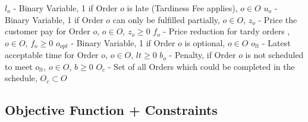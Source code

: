 \documentclass[a4paper,12pt,twoside]{scrreprt}
\begin{document}
\begin{flushleft}
$l_{o}$ - Binary Variable, 1 if Order $o$ is late (Tardiness Fee applies), $o \in O$ \linebreak
$u_{o}$ - Binary Variable, 1 if Order $o$ can only be fulfilled partially, $o \in O$, \linebreak
$z_{o}$ - Price the customer pay for Order $o$, $o \in O$, $z_{o} \geq 0$ \linebreak
$f_{o}$ - Price reduction for tardy orders , $o \in O$, $f_{o} \geq 0$ \linebreak
$o_{opt}$ - Binary Variable, 1 if Order $o$ is optional, $o \in O$ \linebreak
$o_{lt}$ - Latest acceptable time for Order $o$, $o \in O$, $lt \geq 0$ \linebreak
$b_{o}$ - Penalty, if Order $o$ is not scheduled to meet $o_{lt}$, $o \in O$, $b \geq 0$ \linebreak
$O_{c}$ - Set of all Orders which could be completed in the schedule, $O_{c} \subset O$ \linebreak


\end{flushleft}

\subsection{Objective Function + Constraints}
\end{document}
